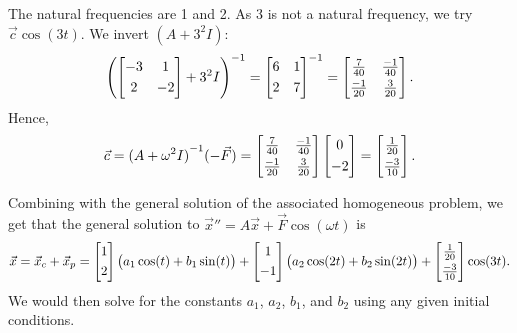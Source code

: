 \begin{example}
The natural frequencies are 1 and 2.  As 3 is not a
natural frequency, we try $\vec{c} \cos (3t)$.
We invert $(A+3^2 I)$:
\begin{equation*}
{\left( \begin{bmatrix}
-3 & 1 \\
\noalign{\smallskip}
2 & -2
\end{bmatrix}
+3^2 I\right)}^{-1}
=
{\begin{bmatrix}
6 & 1 \\
\noalign{\smallskip}
2 & 7
\end{bmatrix}}^{-1}
=
\begin{bmatrix}
\frac{7}{40} & \frac{-1}{40} \\
\noalign{\smallskip}
\frac{-1}{20} & \frac{3}{20}
\end{bmatrix} .
\end{equation*}
Hence,
\begin{equation*}
\vec{c} = 
{(A +\omega^2 I)}^{-1}
(-\vec{F} ) = 
\begin{bmatrix}
\frac{7}{40} & \frac{-1}{40} \\
\noalign{\smallskip}
\frac{-1}{20} & \frac{3}{20}
\end{bmatrix}
\begin{bmatrix}
0 \\
\noalign{\smallskip}
-2
\end{bmatrix}
=
\begin{bmatrix}
\frac{1}{20} \\
\noalign{\smallskip}
\frac{-3}{10}
\end{bmatrix} .
\end{equation*}

Combining with the general solution of the associated
homogeneous problem, we get that the general solution to
${\vec{x}}'' = A \vec{x} + \vec{F} \cos (\omega t)$ is
\begin{equation*}
\vec{x} = \vec{x}_c + \vec{x}_p =
\begin{bmatrix} 1 \\
\noalign{\smallskip}
2 \end{bmatrix}
\bigl( a_1 \cos (t) + b_1 \sin (t) \bigr)
+
\begin{bmatrix} 1 \\
\noalign{\smallskip}
-1 \end{bmatrix}
\bigl( a_2 \cos (2t) + b_2 \sin (2t) \bigr)
+
\begin{bmatrix}
\frac{1}{20} \\
\noalign{\smallskip}
\frac{-3}{10}
\end{bmatrix}
\cos (3t) .
\end{equation*}
We would then solve for the constants
$a_1$, $a_2$, $b_1$, and $b_2$ using
any given initial conditions.
\end{example}

